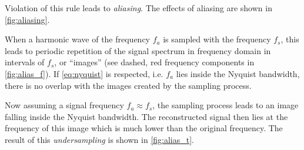 Violation of this rule leads to \textit{aliasing}.
The effects of aliasing are shown in \autoref{fig:aliasing}.

When a harmonic wave of the frequency $f_a$ is sampled with the frequency $f_s$, this leads to periodic repetition of the signal spectrum in frequency domain in intervals of $f_s$, or ``images'' (see dashed, red frequency components in \autoref{fig:alias_f}). 
If \autoref{eq:nyquist} is respected, i.e. $f_a$ lies inside the Nyquist bandwidth, there is no overlap with the images created by the sampling process.

Now assuming a signal frequency $f_a \approx f_s$, the sampling process leads to an image falling inside the Nyquist bandwidth.
The reconstructed signal then lies at the frequency of this image which is much lower than the original frequency.
The result of this \textit{undersampling} is shown in \autoref{fig:alias_t}.




